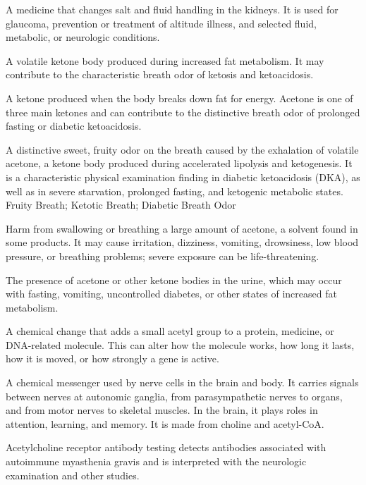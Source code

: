  A medicine that changes salt and fluid handling in the kidneys. It is used for glaucoma, prevention or treatment of altitude illness, and selected fluid, metabolic, or neurologic conditions.

 A volatile ketone body produced during increased fat metabolism. It may contribute to the characteristic breath odor of ketosis and ketoacidosis.

 A ketone produced when the body breaks down fat for energy. Acetone is one of three main ketones and can contribute to the distinctive breath odor of prolonged fasting or diabetic ketoacidosis.

 A distinctive sweet, fruity odor on the breath caused by the exhalation of volatile acetone, a ketone body produced during accelerated lipolysis and ketogenesis. It is a characteristic physical examination finding in diabetic ketoacidosis (DKA), as well as in severe starvation, prolonged fasting, and ketogenic metabolic states.
\synonyms
Fruity Breath; Ketotic Breath; Diabetic Breath Odor

 Harm from swallowing or breathing a large amount of acetone, a solvent found in some products. It may cause irritation, dizziness, vomiting, drowsiness, low blood pressure, or breathing problems; severe exposure can be life-threatening.

 The presence of acetone or other ketone bodies in the urine, which may occur with fasting, vomiting, uncontrolled diabetes, or other states of increased fat metabolism.

 A chemical change that adds a small acetyl group to a protein, medicine, or DNA-related molecule. This can alter how the molecule works, how long it lasts, how it is moved, or how strongly a gene is active.

 A chemical messenger used by nerve cells in the brain
and body. It carries signals between nerves at autonomic ganglia, from
parasympathetic nerves to organs, and from motor nerves to skeletal muscles.
In the brain, it plays roles in attention, learning, and memory. It is made
from choline and acetyl-CoA.

 Acetylcholine receptor antibody testing detects antibodies associated with autoimmune myasthenia gravis and is interpreted with the neurologic examination and other studies.

